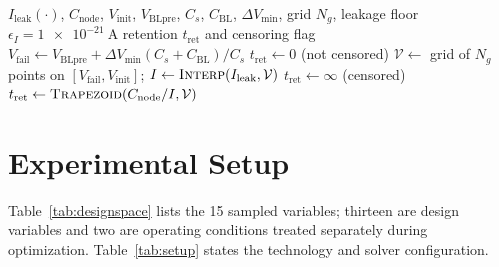 \documentclass[11pt,a4paper]{article}
\newcommand{\Vfail}{V_{\mathrm{fail}}}
\newcommand{\Vblpre}{V_{\mathrm{BLpre}}}
\newcommand{\Ileak}{I_{\mathrm{leak}}}
\newcommand{\Cnode}{C_{\mathrm{node}}}
\newcommand{\Cs}{C_{s}}
\newcommand{\Cbl}{C_{\mathrm{BL}}}
\newcommand{\tret}{t_{\mathrm{ret}}}
\newcommand{\dVmin}{\Delta V_{\min}}
\begin{document}
\begin{algorithm}[!ht]
\caption{Quasi-static retention from measured leakage}
\label{alg:retention}
\begin{algorithmic}[1]
\Require $\Ileak(\cdot)$, $\Cnode$, $V_{\mathrm{init}}$, $\Vblpre$, $\Cs$, $\Cbl$,
$\dVmin$, grid $N_g$, leakage floor $\epsilon_I=\SI{1e-21}{\ampere}$
\Ensure retention $\tret$ and censoring flag
\State $\Vfail \gets \Vblpre + \dVmin(\Cs+\Cbl)/\Cs$
\If{$V_{\mathrm{init}} \le \Vfail$} \Return $\tret \gets 0$ (not censored)
\EndIf
\State $\mathcal{V} \gets$ grid of $N_g$ points on $[\Vfail,V_{\mathrm{init}}]$;
$I \gets \textsc{Interp}(\Ileak,\mathcal{V})$
 \Return $\tret \gets \infty$ (censored)
\EndIf
\State \Return $\tret \gets \textsc{Trapezoid}(\Cnode/I,\mathcal{V})$
\end{algorithmic}
\end{algorithm}

\section{Experimental Setup}
\label{sec:setup}

Table~\ref{tab:designspace} lists the 15 sampled variables; thirteen are design
variables and two are operating conditions treated separately during
optimization. Table~\ref{tab:setup} states the technology and solver
configuration.
\end{document}
